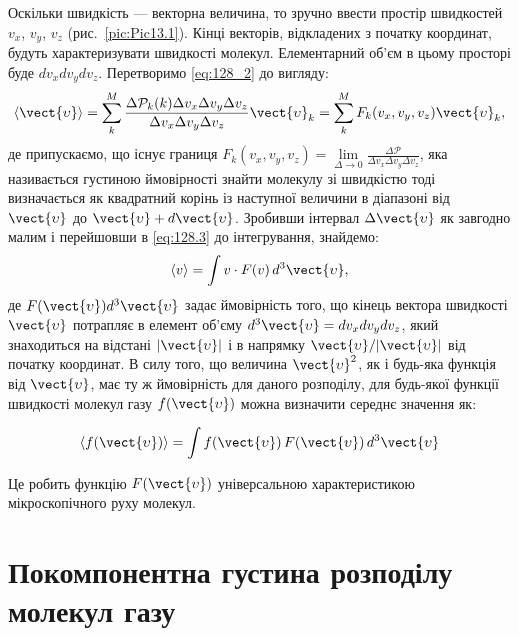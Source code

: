 Оскільки швидкість --- векторна величина, то зручно ввести простір швидкостей $v_x$, $v_y$, $v_z$ (рис.~\ref{pic:Pic13.1}). Кінці векторів, відкладених з початку координат, будуть характеризувати швидкості молекул. Елементарний об’єм в цьому просторі буде $dv_x dv_y dv_z$. Перетворимо \eqref{eq:128_2} до вигляду:
%
\begin{equation}\label{eq:128.3}
    \langle \vect{\upsilon} \rangle  = \sum\limits_k^M \frac{\Delta\mathcal{P}_k(k) \Delta v_x \Delta v_y \Delta v_z}{ \Delta v_x \Delta v_y \Delta v_z} \vect{\upsilon}_k =  \sum\limits_k^M F_k(v_x, v_y, v_z) \vect{\upsilon}_k,
\end{equation}
%
де припускаємо, що існує границя $F_k(v_x, v_y, v_z) = \lim\limits_{\Delta \to 0} \frac{\Delta \mathcal{P}}{\Delta v_x \Delta v_y \Delta v_z}$,
яка називається густиною ймовірності знайти молекулу зі швидкістю тоді визначається як квадратний корінь із наступної величини в діапазоні від $\vect{\upsilon}$ до
$\vect{\upsilon} + d\vect{\upsilon}$.
Зробивши інтервал $\Delta\vect{\upsilon}$ як завгодно малим і перейшовши в \eqref{eq:128.3} до інтегрування, знайдемо:
%
\begin{equation}\label{eq:128.4}
    \langle v \rangle = \int v \cdot F(v)\, d^3\vect{\upsilon},
\end{equation}
%
де $F(\vect{\upsilon}) d^3\vect{\upsilon}$ задає ймовірність того, що кінець вектора швидкості $\vect{\upsilon}$ потрапляє в елемент об’єму ${d}^3\vect{\upsilon} = dv_x dv_y dv_z$, який знаходиться на відстані $|\vect{\upsilon}|$ і в напрямку $\vect{\upsilon}/|\vect{\upsilon}|$ від початку координат. В силу того, що величина $\vect{\upsilon}^2$, як і будь-яка функція від $\vect{\upsilon}$, має ту ж ймовірність для даного розподілу, для будь-якої функції швидкості молекул газу $f(\vect{\upsilon})$ можна визначити середнє значення як:

\begin{equation}
\langle f(\vect{\upsilon}) \rangle = \int f(\vect{\upsilon})\, F(\vect{\upsilon})\, d^3\vect{\upsilon}
\label{eq:128.5}
\end{equation}

Це робить функцію $F(\vect{\upsilon})$ універсальною характеристикою мікроскопічного руху молекул.

\section{Покомпонентна густина розподілу молекул газу}

